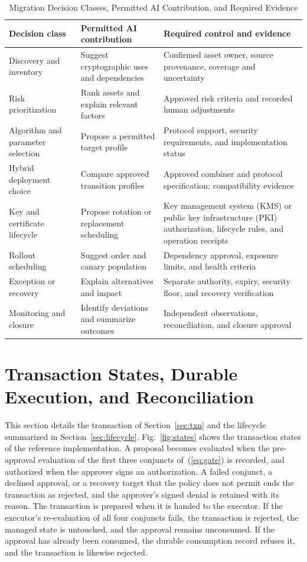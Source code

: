 \documentclass[journal]{IEEEtran}
\begin{document}
\begin{table}[!t]
\caption{Migration Decision Classes, Permitted AI Contribution, and Required Evidence}
\label{tab:decisions}
\centering
\begin{tabular}{>{\raggedright\arraybackslash}p{3.6cm}>{\raggedright\arraybackslash}p{5.4cm}>{\raggedright\arraybackslash}p{6.6cm}}
\toprule
Decision class & Permitted AI contribution & Required control and evidence \\
\midrule
Discovery and inventory & Suggest cryptographic uses and dependencies & Confirmed asset owner, source provenance, coverage and uncertainty \\
Risk prioritization & Rank assets and explain relevant factors & Approved risk criteria and recorded human adjustments \\
Algorithm and parameter selection & Propose a permitted target profile & Protocol support, security requirements, and implementation status \\
Hybrid deployment choice & Compare approved transition profiles & Approved combiner and protocol specification; compatibility evidence \\
Key and certificate lifecycle & Propose rotation or replacement scheduling & Key management system (KMS) or public key infrastructure (PKI) authorization, lifecycle rules, and operation receipts \\
Rollout scheduling & Suggest order and canary population & Dependency approval, exposure limits, and health criteria \\
Exception or recovery & Explain alternatives and impact & Separate authority, expiry, security floor, and recovery verification \\
Monitoring and closure & Identify deviations and summarize outcomes & Independent observations, reconciliation, and closure approval \\
\bottomrule
\end{tabular}
\end{table}

\section{Transaction States, Durable Execution, and Reconciliation}
\label{s:lifecycle}
This section details the transaction of Section~\ref{sec:txn} and the lifecycle summarized in Section~\ref{sec:lifecycle}. Fig.~\ref{fig:states} shows the transaction states of the reference implementation. A proposal becomes evaluated when the pre-approval evaluation of the first three conjuncts of~(\ref{eq:gate}) is recorded, and authorized when the approver signs an authorization. A failed conjunct, a declined approval, or a recovery target that the policy does not permit ends the transaction as rejected, and the approver's signed denial is retained with its reason. The transaction is prepared when it is handed to the executor. If the executor's re-evaluation of all four conjuncts fails, the transaction is rejected, the managed state is untouched, and the approval remains unconsumed. If the approval has already been consumed, the durable consumption record refuses it, and the transaction is likewise rejected.
\end{document}

